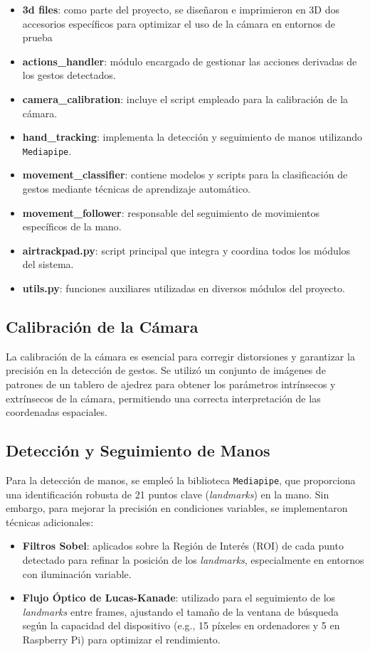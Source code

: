 \documentclass[a4paper,12pt]{article}
\begin{document}
{\begin{itemize}
    \item \textbf{3d files}: como parte del proyecto, se diseñaron e imprimieron en 3D dos accesorios específicos para optimizar el uso de la cámara en entornos de prueba
    \item \textbf{actions\_handler}: módulo encargado de gestionar las acciones derivadas de los gestos detectados.
    \item \textbf{camera\_calibration}: incluye el script empleado para la calibración de la cámara.
    \item \textbf{hand\_tracking}: implementa la detección y seguimiento de manos utilizando \texttt{Mediapipe}.
    \item \textbf{movement\_classifier}: contiene modelos y scripts para la clasificación de gestos mediante técnicas de aprendizaje automático.
    \item \textbf{movement\_follower}: responsable del seguimiento de movimientos específicos de la mano.
    \item \textbf{airtrackpad.py}: script principal que integra y coordina todos los módulos del sistema.
    \item \textbf{utils.py}: funciones auxiliares utilizadas en diversos módulos del proyecto.
\end{itemize}

\subsection{Calibración de la Cámara}
La calibración de la cámara es esencial para corregir distorsiones y garantizar la precisión en la detección de gestos. Se utilizó un conjunto de imágenes de patrones de un tablero de ajedrez para obtener los parámetros intrínsecos y extrínsecos de la cámara, permitiendo una correcta interpretación de las coordenadas espaciales.

\subsection{Detección y Seguimiento de Manos}
Para la detección de manos, se empleó la biblioteca \texttt{Mediapipe}, que proporciona una identificación robusta de 21 puntos clave (\textit{landmarks}) en la mano. Sin embargo, para mejorar la precisión en condiciones variables, se implementaron técnicas adicionales:

\begin{itemize}
    \item \textbf{Filtros Sobel}: aplicados sobre la Región de Interés (ROI) de cada punto detectado para refinar la posición de los \textit{landmarks}, especialmente en entornos con iluminación variable.
    \item \textbf{Flujo Óptico de Lucas-Kanade}: utilizado para el seguimiento de los \textit{landmarks} entre frames, ajustando el tamaño de la ventana de búsqueda según la capacidad del dispositivo (e.g., 15 píxeles en ordenadores y 5 en Raspberry Pi) para optimizar el rendimiento.
\end{itemize}

}
\end{document}
